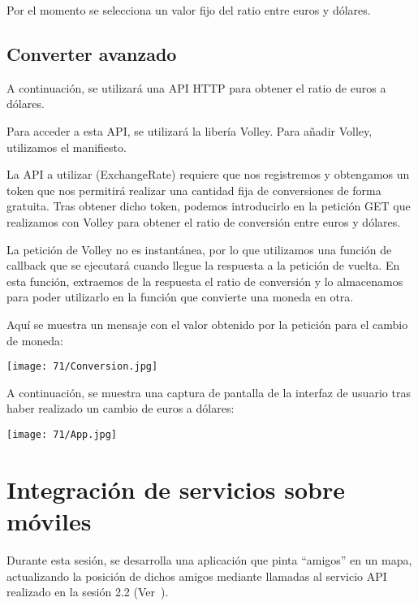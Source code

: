 Por el momento se selecciona un valor fijo del ratio entre euros y dólares.

\subsection{Converter avanzado}
A continuación, se utilizará una API HTTP para obtener el ratio de euros a dólares.

Para acceder a esta API, se utilizará la libería Volley.
Para añadir Volley, utilizamos el manifiesto.

La API a utilizar (ExchangeRate) requiere que nos registremos y obtengamos un token
que nos permitirá realizar una cantidad fija de conversiones de forma gratuita.
Tras obtener dicho token, podemos introducirlo en la petición GET que realizamos con
Volley para obtener el ratio de conversión entre euros y dólares.

La petición de Volley no es instantánea, por lo que utilizamos una función de callback
que se ejecutará cuando llegue la respuesta a la petición de vuelta.
En esta función, extraemos de la respuesta el ratio de conversión y lo almacenamos
para poder utilizarlo en la función que convierte una moneda en otra.

Aquí se muestra un mensaje con el valor obtenido por la petición para el cambio de moneda:

\begin{minipage}{\linewidth}
	\centering
	\texttt{[image: 71/Conversion.jpg]}
	\label{fig:7/1}
\end{minipage}

A continuación, se muestra una captura de pantalla de la interfaz de usuario tras
haber realizado un cambio de euros a dólares:

\begin{minipage}{\linewidth}
	\centering
	\texttt{[image: 71/App.jpg]}
	\label{fig:7/2}
\end{minipage}

\newpage{}
\section{Integración de servicios sobre móviles}\label{sec:7/2}
Durante esta sesión, se desarrolla una aplicación que pinta ``amigos'' en un mapa,
actualizando la posición de dichos amigos mediante llamadas al servicio API realizado
en la sesión 2.2 (Ver~).

